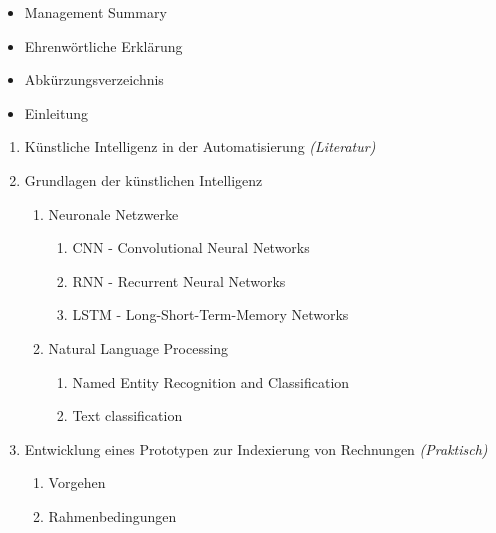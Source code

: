 \documentclass{hwz}
\begin{document}
{
    \renewcommand\labelitemi{--}
    \renewcommand{\labelenumi}{\arabic{enumi}}
    \renewcommand{\labelenumii}{\labelenumi.\arabic{enumii}}
    \renewcommand{\labelenumiii}{\labelenumii.\arabic{enumiii}}
    \begin{itemize}[topsep=0pt,itemsep=2pt,partopsep=4pt, parsep=4pt]
        \item Management Summary
        \item Ehrenwörtliche Erklärung
        \item Abkürzungsverzeichnis
        \item Einleitung
    \end{itemize}
    \begin{enumerate}[topsep=0pt,itemsep=2pt,partopsep=4pt, parsep=4pt]
        \item Künstliche Intelligenz in der Automatisierung \textit{(Literatur)}
        \item Grundlagen der künstlichen Intelligenz
        \begin{enumerate}[topsep=0pt,itemsep=2pt,partopsep=4pt, parsep=4pt]
            \item Neuronale Netzwerke
            \begin{enumerate}[topsep=0pt,itemsep=2pt,partopsep=4pt, parsep=4pt]
                \item CNN - Convolutional Neural Networks
                \item RNN - Recurrent Neural Networks
                \item LSTM - Long-Short-Term-Memory Networks
            \end{enumerate}
            \item Natural Language Processing
            \begin{enumerate}[topsep=0pt,itemsep=2pt,partopsep=4pt, parsep=4pt]
                \item Named Entity Recognition and Classification
                \item Text classification
            \end{enumerate}
        \end{enumerate}
        \item Entwicklung eines Prototypen zur Indexierung von Rechnungen \textit{(Praktisch)}
        \begin{enumerate}[topsep=0pt,itemsep=2pt,partopsep=4pt, parsep=4pt]
            \item Vorgehen
            \item Rahmenbedingungen
            \begin{enumerate}[topsep=0pt,itemsep=2pt,partopsep=4pt, parsep=4pt]

\end{enumerate}
\end{enumerate}
\end{enumerate}}
\end{document}
